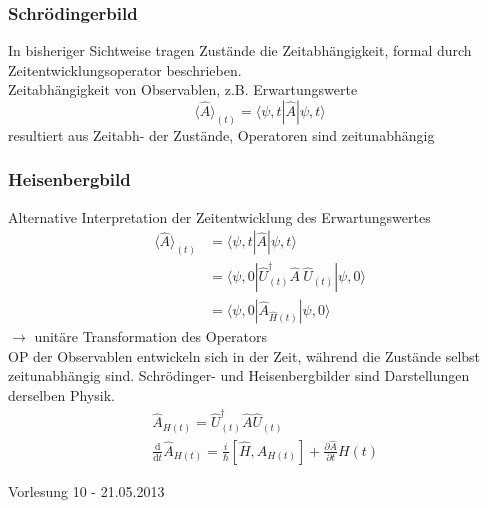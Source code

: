 \documentclass[10pt,article,colorback,accentcolor=tud9d]{scrartcl}
\begin{document}
\subsubsection{Schrödingerbild}
In bisheriger Sichtweise tragen Zustände die Zeitabhängigkeit, formal durch Zeitentwicklungsoperator beschrieben.\\
Zeitabhängigkeit von Observablen, z.B. Erwartungswerte
\begin{equation}
\langle\hat{A}\rangle_{(t)}=\langle\psi,t|\hat{A}|\psi,t\rangle
\end{equation}
resultiert aus Zeitabh- der Zustände, Operatoren sind zeitunabhängig
\subsubsection{Heisenbergbild}
Alternative Interpretation der Zeitentwicklung des Erwartungswertes 
\begin{align}
\langle\hat{A}\rangle_{(t)}&=\langle\psi,t|\hat{A}|\psi,t\rangle\\
&=\langle\psi,0|\hat{U}^\dagger_{(t)}\hat{A}\ \hat{U}_{(t)}|\psi,0\rangle\\
&=\langle\psi,0|\hat{A}_{\hat{H}(t)}|\psi,0\rangle
\end{align}
$\rightarrow$ unitäre Transformation des Operators\\
OP der Observablen entwickeln sich in der Zeit, während die Zustände selbst zeitunabhängig sind. Schrödinger- und Heisenbergbilder sind Darstellungen derselben Physik.
\begin{align}
&\hat{A}_{H(t)}=\hat{U}^\dagger_{(t)}\hat{A}\hat{U}_{(t)}\\
&\frac{\text{d}}{\text{d}t}\hat{A}_{H(t)}=\frac{i}{\hbar}\left[\hat{H},\hat{A}_{H(t)}\right]+\frac{\partial \hat{A}}{\partial t}H(t)
\end{align}

\begin{flushright}
Vorlesung 10 - 21.05.2013
\end{flushright}
\end{document}
